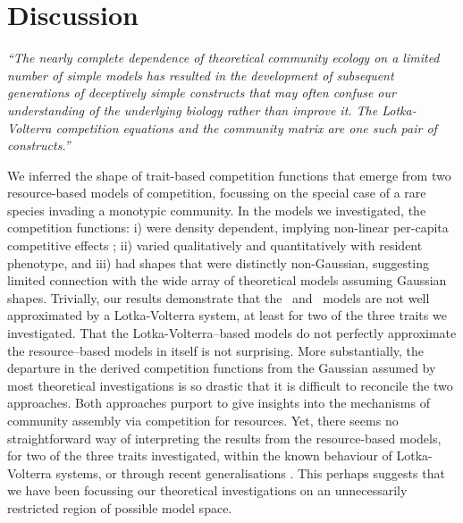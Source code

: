 \documentclass[a4paper,11pt]{article}
\begin{document}
\section{Discussion}

\emph{``The nearly complete dependence of theoretical community ecology on a
limited number of simple models has resulted in the development of subsequent
generations of deceptively simple constructs that may often confuse our
understanding of the underlying biology rather than improve it. The
Lotka-Volterra competition equations and the community matrix are one such
pair of constructs.''} \citep{Neill-1974}

We inferred the shape of trait-based competition functions that emerge
from two resource-based models of competition, focussing on the
special case of a rare species invading a monotypic community.
%
In the models we investigated, the competition functions: i) were
density dependent, implying non-linear per-capita competitive effects
\citep{Abrams-1980}; ii) varied qualitatively and quantitatively with
resident phenotype,
and iii) had shapes that were distinctly non-Gaussian, suggesting
limited connection with the wide array of theoretical models assuming
Gaussian shapes.
%
Trivially, our results demonstrate that the \Rstar\ and \plant\ models
are not well approximated by a Lotka-Volterra system, at least for two
of the three traits we investigated. That the Lotka-Volterra--based
models do not perfectly approximate the resource--based models in
itself is not surprising.
%
More substantially, the departure in the derived competition functions
from the Gaussian assumed by most theoretical investigations
is so drastic that it is difficult to reconcile the two approaches.
Both approaches purport to give insights into the mechanisms of
community assembly via competition for resources.  Yet, there seems no
straightforward way of interpreting the results from the
resource-based models, for two of the three traits investigated,
within the known behaviour of Lotka-Volterra systems, or through
recent generalisations \citep{Leimar-2013}. This perhaps suggests that
we have been focussing our theoretical investigations on an
unnecessarily restricted region of possible model space.
\end{document}
